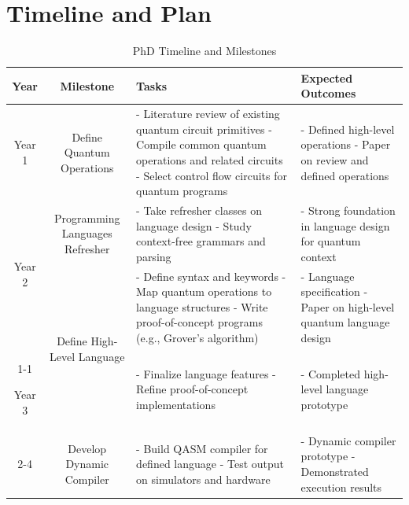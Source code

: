 \documentclass[journal,onecolumn, compsoc]{IEEEtran}
\begin{document}
\section{Timeline and Plan}\label{sec:timeline-plan}

\begin{table}[H]
\centering
\caption{PhD Timeline and Milestones}
\begin{tabular}{@{}c|c|p{6cm}|p{5cm}@{}}
\toprule
\textbf{Year} & \textbf{Milestone} & \textbf{Tasks} & \textbf{Expected Outcomes} \\
\midrule

Year 1 
& Define Quantum Operations 
& - Literature review of existing quantum circuit primitives \newline
  - Compile common quantum operations and related circuits \newline
  - Select control flow circuits for quantum programs 
& - Defined high-level operations \newline
  - Paper on review and defined operations \\
\midrule

\multirow{2}{*}{Year 2} 
& Programming Languages Refresher 
& - Take refresher classes on language design \newline
  - Study context-free grammars and parsing 
& - Strong foundation in language design for quantum context \\
\cmidrule{2-4}

& \multirow{2}{*}{Define High-Level Language} 
& - Define syntax and keywords \newline
  - Map quantum operations to language structures \newline
  - Write proof-of-concept programs (e.g., Grover's algorithm) 
& - Language specification \newline
  - Paper on high-level quantum language design \\
\cline{1-1} %

Year 3 
&  
& - Finalize language features \newline
  - Refine proof-of-concept implementations 
& - Completed high-level language prototype \\
\cmidrule{2-4}

\multirow{1}{*}{} 
& Develop Dynamic Compiler 
& - Build QASM compiler for defined language \newline
  - Test output on simulators and hardware 
& - Dynamic compiler prototype \newline
  - Demonstrated execution results \\
\midrule


\end{tabular}
\end{table}
\end{document}
